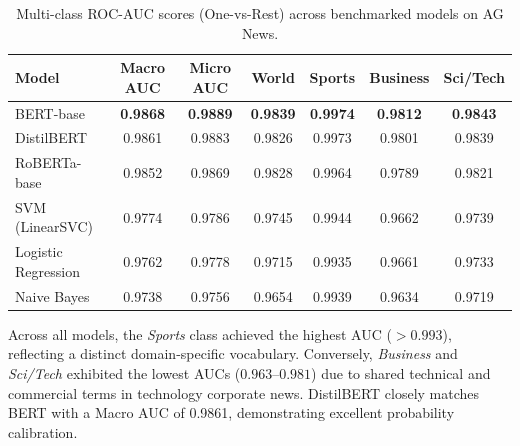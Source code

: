 \documentclass[12pt, a4paper]{article}
\begin{document}
\begin{table}[H]
    \centering
    \caption{Multi-class ROC-AUC scores (One-vs-Rest) across benchmarked models on AG News.}
    \label{tab:roc_auc}
    \begin{tabular}{lcccccc}
        \toprule
        \textbf{Model} & \textbf{Macro AUC} & \textbf{Micro AUC} & \textbf{World} & \textbf{Sports} & \textbf{Business} & \textbf{Sci/Tech} \\
        \midrule
        BERT-base & \textbf{0.9868} & \textbf{0.9889} & \textbf{0.9839} & \textbf{0.9974} & \textbf{0.9812} & \textbf{0.9843} \\
        DistilBERT & 0.9861 & 0.9883 & 0.9826 & 0.9973 & 0.9801 & 0.9839 \\
        RoBERTa-base & 0.9852 & 0.9869 & 0.9828 & 0.9964 & 0.9789 & 0.9821 \\
        SVM (LinearSVC) & 0.9774 & 0.9786 & 0.9745 & 0.9944 & 0.9662 & 0.9739 \\
        Logistic Regression & 0.9762 & 0.9778 & 0.9715 & 0.9935 & 0.9661 & 0.9733 \\
        Naive Bayes & 0.9738 & 0.9756 & 0.9654 & 0.9939 & 0.9634 & 0.9719 \\
        \bottomrule
    \end{tabular}
\end{table}

Across all models, the \textit{Sports} class achieved the highest AUC ($>0.993$), reflecting a distinct domain-specific vocabulary. Conversely, \textit{Business} and \textit{Sci/Tech} exhibited the lowest AUCs ($0.963$--$0.981$) due to shared technical and commercial terms in technology corporate news. DistilBERT closely matches BERT with a Macro AUC of 0.9861, demonstrating excellent probability calibration.
\end{document}

